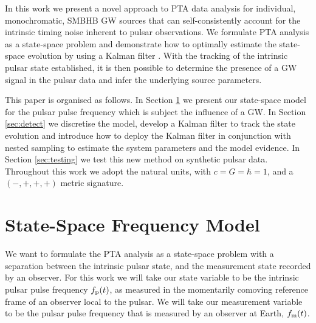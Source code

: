 \documentclass[fleqn,usenatbib,useAMS]{mnras}
\begin{document}
In this work we present a novel approach to PTA data analysis for individual, monochromatic, SMBHB GW sources that can self-consistently account for the intrinsic timing noise inherent to pulsar observations. We formulate PTA analysis as a state-space problem and demonstrate how to optimally estimate the state-space evolution by using a Kalman filter 
\citep{Kalman1,Meyers2021,Melatos2023}.  With the tracking of the intrinsic pulsar state established, it is then possible to determine the presence of a GW signal in the pulsar data and infer the underlying source parameters. \newline 

\noindent This paper is organised as follows. In Section \ref{sec:model} we present our state-space model for the pulsar pulse frequency which is subject the influence of a GW. In Section \ref{sec:detect} we discretise the model, develop a Kalman filter to track the state evolution and introduce how to deploy the Kalman filter in conjunction with nested sampling to estimate the system parameters and the model evidence. In Section \ref{sec:testing} we test this new method on synthetic pulsar data. Throughout this work we adopt the natural units, with $c = G = \hbar = 1$, and a $(-,+,+,+)$ metric signature. \newline 






%

%
%



\section{State-Space Frequency Model}\label{sec:model}
We want to formulate the PTA analysis as a state-space problem with a separation between the intrinsic pulsar state, and the measurement state recorded by an observer. For this work we will take our state variable to be the intrinsic pulsar pulse frequency $f_{\rm p}(t)$, as measured in the momentarily comoving reference frame of an observer local to the pulsar. We will take our measurement variable to be the pulsar pulse frequency that is measured by an observer at Earth, $f_{\rm m}(t)$.  
\end{document}
